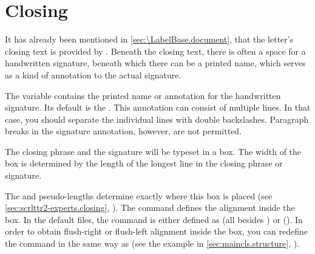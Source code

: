 \section{Closing}
\BeginIndexGroup%
%
%
%
%

It has already been mentioned in \autoref{sec:\LabelBase.document},
 that the letter's closing text is
provided by . Beneath the
closing text, there is often a space for a handwritten signature, beneath
which there can be a printed name, which serves as a kind of annotation to the
actual signature.

\begin{Declaration}
\end{Declaration}
The  variable contains the printed name or annotation for
the handwritten signature. Its default  is the
. This annotation can
consist of multiple lines. In that case, you should separate the individual
lines with double backslashes. Paragraph breaks in the
signature annotation, however, are not permitted.%
\EndIndexGroup


\begin{Declaration}
\end{Declaration}
The closing phrase and the signature will be typeset in a box. The width of
the box is determined by the length of the longest line in the closing
phrase or signature.

The  and
 pseudo-lengths determine
exactly where this box is placed (see \autoref{sec:scrlttr2-experts.closing},
). The 
command defines the alignment inside the box. In the default  files,
the command is either defined as  (all besides
) or  (). In order to
obtain flush-right or flush-left alignment inside the box, you can redefine
the command in the same way as  (see the
example in \autoref{sec:maincls.structure},
).

